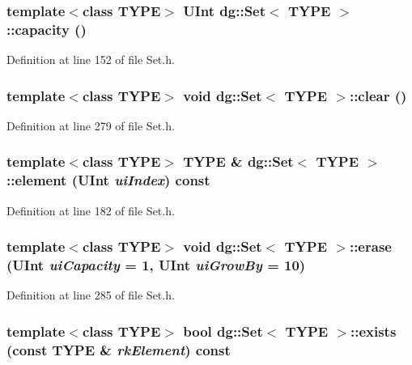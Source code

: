 \subsubsection{\setlength{\rightskip}{0pt plus 5cm}template$<$class TYPE$>$ {\bf UInt} dg::Set$<$ TYPE $>$::capacity ()\hspace{0.3cm}{\tt  [inline]}}\label{classdg_1_1Set_a4}




Definition at line 152 of file Set.h.
\subsubsection{\setlength{\rightskip}{0pt plus 5cm}template$<$class TYPE$>$ void dg::Set$<$ TYPE $>$::clear ()}\label{classdg_1_1Set_a18}




Definition at line 279 of file Set.h.
\subsubsection{\setlength{\rightskip}{0pt plus 5cm}template$<$class TYPE$>$ TYPE \& dg::Set$<$ TYPE $>$::element ({\bf UInt} {\em ui\-Index}) const\hspace{0.3cm}{\tt  [inline]}}\label{classdg_1_1Set_a9}




Definition at line 182 of file Set.h.
\subsubsection{\setlength{\rightskip}{0pt plus 5cm}template$<$class TYPE$>$ void dg::Set$<$ TYPE $>$::erase ({\bf UInt} {\em ui\-Capacity} = 1, {\bf UInt} {\em ui\-Grow\-By} = 10)}\label{classdg_1_1Set_a17}




Definition at line 285 of file Set.h.
\subsubsection{\setlength{\rightskip}{0pt plus 5cm}template$<$class TYPE$>$ bool dg::Set$<$ TYPE $>$::exists (const TYPE \& {\em rk\-Element}) const}\label{classdg_1_1Set_a15}




